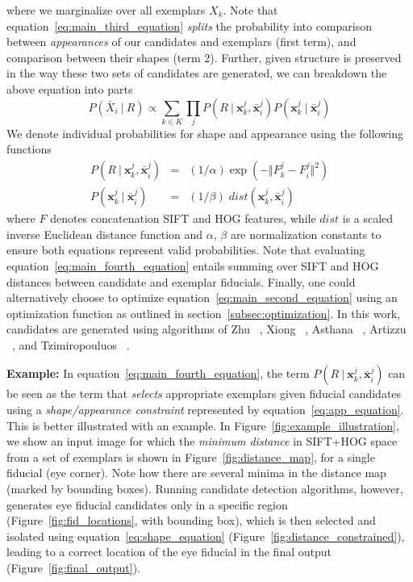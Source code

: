where we marginalize over all exemplars $X_k$. Note that
equation~\ref{eq:main_third_equation} \emph{splits} the probability into comparison between
\emph{appearances} of our candidates and exemplars (first term), and comparison between their
shapes (term 2). Further, given structure is preserved in the way these two sets of candidates are 
generated, we can breakdown the above equation into parts
\begin{equation}
  P( \bar{X}_i~|~R ) \propto \sum_{k\in K} \prod_j P( R~|~\mathbf{x}_k^j, \bar{\mathbf{x}}_i^j) P( \mathbf{x}_k^j~|~\bar{\mathbf{x}}_i^j )
  \label{eq:main_fourth_equation}
\end{equation}
We denote individual probabilities for shape and appearance using the following functions
\begin{eqnarray}
  P( R~|~\mathbf{x}_k^j, \bar{\mathbf{x}}_i^j) & = & (1/\alpha) \exp( -\Vert F_k^j - F_i^j \Vert^2 ) 
  \label{eq:app_equation} \\
  P( \mathbf{x}_k^j~|~\bar{\mathbf{x}}_i^j )  & = & (1/\beta) \; dist( \mathbf{x}_k^j, \bar{\mathbf{x}}_i^j )
  \label{eq:shape_equation}
\end{eqnarray}
where $F$ denotes concatenation SIFT and HOG features, while $dist$ is a scaled inverse Euclidean
distance function and $\alpha$, $\beta$ are normalization constants to ensure both equations represent valid probabilities. Note that evaluating equation~\ref{eq:main_fourth_equation} 
entails summing over SIFT and HOG distances between candidate and exemplar fiducials.
Finally, one could alternatively choose to optimize equation~\ref{eq:main_second_equation} using
an optimization function as outlined in section~\ref{subsec:optimization}.
In this work, candidates are generated using algorithms of Zhu \etal~\cite{xhuCVPR12_wild}, 
Xiong \etal~\cite{xiongCVPR13_SDM}, Asthana \etal~\cite{asthanaCVPR14_Chehra}, Artizzu
\etal~\cite{artizzzuICCV13_COFW}, and Tzimiropouluos \etal~\cite{Tzimiropoulos_2015_CVPR}.

\textbf{Example:}
In equation~\ref{eq:main_fourth_equation}, the term $P( R~|~\mathbf{x}_k^j,\bar{\mathbf{x}}_i^j )$
can be seen as the term that \emph{selects} appropriate exemplars given fiducial candidates 
using a \emph{shape/appearance constraint} represented by equation~\ref{eq:app_equation}. This is better
illustrated with an example. In Figure~\ref{fig:example_illustration}, we show an input image
for which the \emph{minimum distance} in SIFT+HOG space from a set of exemplars is shown in 
Figure~\ref{fig:distance_map}, for a single fiducial (eye corner). Note how there are several
minima in the distance map (marked by bounding boxes). Running candidate detection algorithms,
however, generates eye fiducial candidates only in a specific region (Figure~\ref{fig:fid_locations}, with
bounding box), which is then selected and isolated using equation~\ref{eq:shape_equation}
(Figure~\ref{fig:distance_constrained}), leading to a correct location of the eye fiducial in the
final output (Figure~\ref{fig:final_output}).

